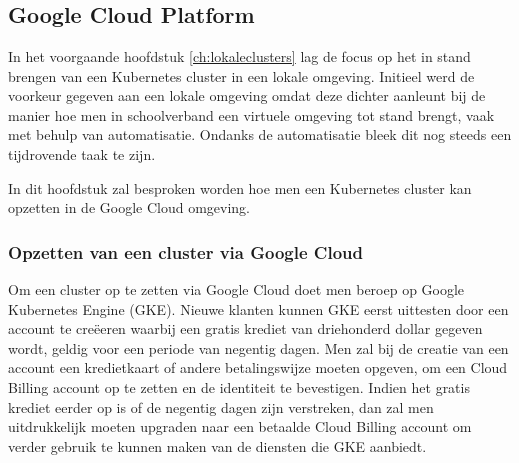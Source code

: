
\chapter{}
\label{ch:cloudclusters}

\section{Google Cloud Platform}

In het voorgaande hoofdstuk \ref{ch:lokaleclusters} lag de focus op het in stand brengen van een Kubernetes cluster in een lokale omgeving. Initieel werd de voorkeur gegeven aan een lokale omgeving omdat deze dichter aanleunt bij de manier hoe men in schoolverband een virtuele omgeving tot stand brengt, vaak met behulp van automatisatie. Ondanks de automatisatie bleek dit nog steeds een tijdrovende taak te zijn. 

In dit hoofdstuk zal besproken worden hoe men een Kubernetes cluster kan opzetten in de Google Cloud omgeving. 

\subsection{Opzetten van een cluster via Google Cloud}
\label{sec:cloudclustersetup}

Om een cluster op te zetten via Google Cloud doet men beroep op Google Kubernetes Engine (GKE). Nieuwe klanten kunnen GKE eerst uittesten door een account te creëeren waarbij een gratis krediet van driehonderd dollar gegeven wordt, geldig voor een periode van negentig dagen. Men zal bij de creatie van een account een kredietkaart of andere betalingswijze moeten opgeven, om een Cloud Billing account op te zetten en de identiteit te bevestigen. Indien het gratis krediet eerder op is of de negentig dagen zijn verstreken, dan zal men uitdrukkelijk moeten upgraden naar een betaalde Cloud Billing account om verder gebruik te kunnen maken van de diensten die GKE aanbiedt. \autocite{GoogleCloud2022} 

